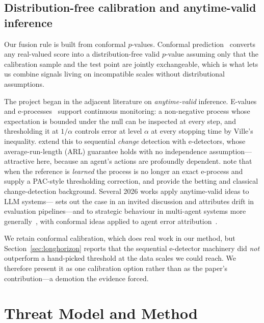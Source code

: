 \documentclass[preprint,12pt,number]{elsarticle}
\theoremstyle{definition}
\begin{document}
\subsection{Distribution-free calibration and anytime-valid inference}

Our fusion rule is built from conformal $p$-values. Conformal
prediction~\citep{vovk2022algorithmic} converts any real-valued score into a
distribution-free valid $p$-value assuming only that the calibration sample and
the test point are jointly exchangeable, which is what lets us combine signals living on incompatible scales
without distributional assumptions.

The project began in the adjacent literature on \emph{anytime-valid} inference.
E-values and e-processes~\citep{vovk2021evalues,ramdas2023gametheoretic,
grunwald2024safetesting} support continuous monitoring: a non-negative process
whose expectation is bounded under the null can be inspected at every step, and
thresholding it at $1/\alpha$ controls error at level $\alpha$ at every stopping
time by Ville's inequality. \citet{shin2023edetectors} extend this to sequential
\emph{change} detection with e-detectors, whose average-run-length (ARL) guarantee
holds with no independence assumption---attractive here, because an agent's
actions are profoundly dependent. \citet{sadhuka2025evaluator} note that when the
reference is \emph{learned} the process is no longer an exact e-process and supply
a PAC-style thresholding correction, and
\citet{waudbysmith2023betting,page1954cusum,lorden1971procedures} provide the
betting and classical change-detection background.
Several 2026 works apply anytime-valid ideas to LLM
systems---\citet{xie2026sequential} sets out the case in an invited discussion
and \citet{li2026whodrifted} attributes drift in evaluation pipelines---and to
strategic behaviour in multi-agent systems more
generally~\citep{gauthier2026strategic}, with conformal ideas applied to agent
error attribution~\citep{feng2026conformalattribution}.

We retain conformal calibration, which does real work in our method, but
Section~\ref{sec:longhorizon} reports that the sequential e-detector machinery
did \emph{not} outperform a hand-picked threshold at the data scales we could
reach. We therefore present it as one calibration option rather than as the
paper's contribution---a demotion the evidence forced.

\section{Threat Model and Method}\label{sec:setup}
\end{document}
